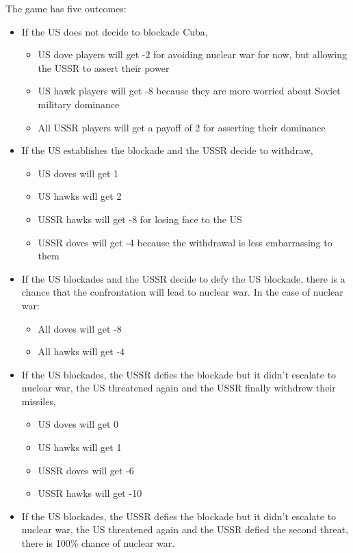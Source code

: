 \documentclass[12pt]{exam}
\begin{document}
The game has five outcomes: 
\begin{itemize}
  \item If the US does not decide to blockade Cuba, 
  \begin{itemize}
    \item US dove players will get -2 for avoiding nuclear war for now, but allowing the USSR to assert their power
    \item US hawk players will get -8 because they are more worried about Soviet military dominance
    \item All USSR players will get a payoff of 2 for asserting their dominance
  \end{itemize}
  \item If the US establishes the blockade and the USSR decide to withdraw,
  \begin{itemize}
    \item US doves will get 1
    \item US hawks will get 2
    \item USSR hawks will get -8 for losing face to the US
    \item USSR doves will get -4 because the withdrawal is less embarrassing to them 
  \end{itemize}
  \item If the US blockades and the USSR decide to defy the US blockade, 
  there is a chance that the confrontation will lead to nuclear war.
  In the case of nuclear war:
  \begin{itemize}
    \item All doves will get -8
    \item All hawks will get -4
  \end{itemize}
  \item If the US blockades, the USSR defies the blockade but it didn't escalate to nuclear war,
  the US threatened again and the USSR finally withdrew their missiles,
  \begin{itemize}
    \item US doves will get 0
    \item US hawks will get 1
    \item USSR doves will get -6
    \item USSR hawks will get -10
  \end{itemize}
  \item If the US blockades, the USSR defies the blockade but it didn't escalate to nuclear war,
  the US threatened again and the USSR defied the second threat, there is 100\% chance of nuclear war.
\end{itemize}
\end{document}
